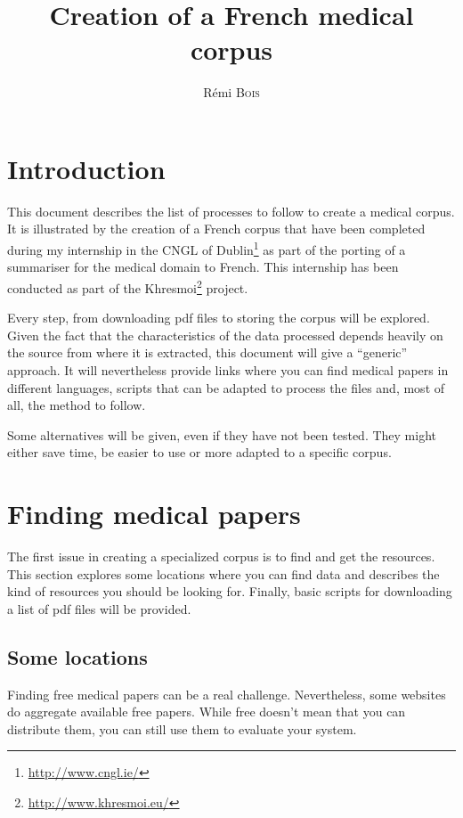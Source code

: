 \documentclass[a4paper,10pt]{article}
\title{Creation of a French medical corpus}
\author{ Rémi \textsc{Bois}}
\begin{document}
\maketitle

\tableofcontents

\newpage

\section{Introduction}
\label{sec:intro}

This document describes the list of processes to follow to create a
medical corpus. It is illustrated by the creation of a French corpus
that have been completed during my internship in the CNGL of
Dublin\footnote{\url{http://www.cngl.ie/}} as part of the porting of a
summariser for the medical domain to French. This internship has been
conducted as part of the
Khresmoi\footnote{\url{http://www.khresmoi.eu/}} project.

Every step, from downloading pdf files to storing the corpus will be
explored. Given the fact that the characteristics of the data
processed depends heavily on the source from where it is extracted,
this document will give a ``generic'' approach. It will nevertheless
provide links where you can find  medical papers in different
languages, scripts that can be adapted to process the files and, most
of all, the method to follow.

Some alternatives will be given, even if they have not been
tested. They might either save time, be easier to use or more adapted to
a specific corpus.

\section{Finding medical papers}
\label{sec:findingpapers}

The first issue in creating a specialized corpus is to find and get
the resources. This section explores some locations where you can find
data and describes the kind of resources you should be looking
for. Finally, basic scripts for downloading a list of pdf files will
be provided.

\subsection{Some locations}
\label{sec:locations}

Finding free medical papers can be a real challenge. Nevertheless,
some websites do aggregate available free papers. While free doesn't
mean that you can distribute them, you can still use them to evaluate
your system.
\end{document}
